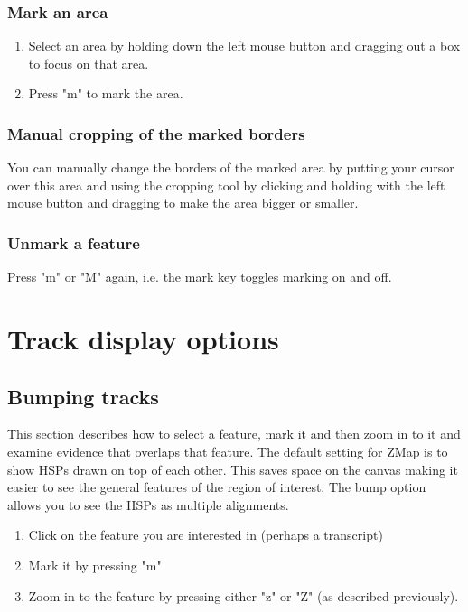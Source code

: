 \documentclass[letterpaper]{article}
\begin{document}
\subsubsection{Mark an area}
\begin{enumerate}
\item Select an area by holding down the left mouse button and dragging out a box to focus on that area.
\item Press "m" to mark the area.
\end{enumerate}

\subsubsection{Manual cropping of the marked borders}
You can manually change the borders of the marked area by putting your cursor over this area and using the cropping tool by clicking and holding with the left mouse button and dragging to make the area bigger or smaller.

\subsubsection{Unmark a feature}
Press "m" or "M" again, i.e. the mark key toggles marking on and off.


\clearpage
\section{Track display options}

\subsection{Bumping tracks}
This section describes how to select a feature, mark it and then zoom in to it and examine evidence that overlaps that feature. The default setting for ZMap is to show HSPs drawn on top of each other. This saves space on the canvas making it easier to see the general features of the region of interest. The bump option allows you to see the HSPs as multiple alignments.
\begin{enumerate}
\item Click on the feature you are interested in (perhaps a transcript)
\item Mark it by pressing "m"
\item Zoom in to the feature by pressing either "z" or "Z" (as described previously).
\end{enumerate}
\end{document}
